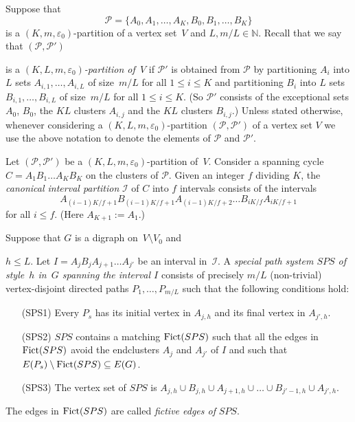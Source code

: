\documentclass{memo-l}
\def\COMMENT#1{}
\def\cP{\mathcal{P}}
\def\eps{\varepsilon}
\def\epszero{\eps_0}
\numberwithin{section}{chapter}
\numberwithin{equation}{section}
\numberwithin{firstthm}{section}
\numberwithin{figure}{section}
\begin{document}
{Suppose that 
$$
\mathcal{P}=\{A_0,A_1,\dots,A_K,B_0,B_1,\dots,B_K\}
$$ is a $(K,m,\eps_0)$-partition of a vertex set~$V$ and $L,m/L\in\mathbb{N}$.
Recall that we say that $(\mathcal{P},\mathcal{P'})$%
\COMMENT{the roles of $\mathcal{P},\mathcal{P'}$ were interchanged in a recent version. There may be places where this was overlooked.}
 is a \emph{$(K, L, m, \epszero)$-partition of~$V$} if $\mathcal{P'}$ is 
obtained from $\mathcal{P}$ by partitioning  $A_i$ 
into $L$ sets $A_{i,1},\dots,A_{i,L}$ of size~$m/L$ for all $1 \leq i \leq K$ and partitioning  $B_i$  into $L$ sets $B_{i,1},\dots,B_{i,L}$ of size~$m/L$ for all $1 \leq i \leq K$.
(So $\cP'$ consists of the exceptional sets $A_0$, $B_0$, the $KL$ clusters $A_{i,j}$ and the $KL$ clusters $B_{i,j}$.)
Unless stated otherwise, whenever considering a $(K, L, m, \epszero)$-partition $(\mathcal{P},\mathcal{P'})$ of a vertex set $V$
we use the above notation to denote the elements of $\mathcal P$ and $\mathcal P'$.

Let $(\mathcal{P},\mathcal{P'})$ be a $(K,L,m, \epszero)$-partition of~$V$.
Consider a spanning cycle $C = A_1 B_1 \dots A_K B_K$ on the clusters of $\mathcal{P}$.
Given an integer $f$ dividing $K$, the \emph{canonical interval partition} $\mathcal{I}$ of $C$ into $f$ intervals
consists of the intervals $$A_{(i-1)K/f+1} B_{(i-1)K/f+1} A_{(i-1)K/f+2} \dots B_{iK/f} A_{iK/f+1}$$ for all $i\le f$.
(Here $A_{K+1}:=A_1$.)

Suppose that $G$ is a digraph on~$V\setminus V_0$ and%
    \COMMENT{Have $V\setminus V_0$ instead of $V$ here since this is what we use later.}
$h\le L$. Let $I=A_jB_jA_{j+1}\dots A_{j'}$ be an interval in~$\mathcal{I}$.
A \emph{special path system $SPS$ of style~$h$ in~$G$ 
spanning the interval $I$} consists of precisely $m/L$ (non-trivial)
vertex-disjoint directed paths $P_1,\dots,P_{m/L}$ such that the following conditions hold:
\begin{itemize}
\item[(SPS1)] Every $P_s$ has its initial vertex in $A_{j,h}$ and its final vertex in $A_{j',h}$.
\item[(SPS2)] $SPS$ contains a matching ${\rm Fict}(SPS)$ such that all the edges in ${\rm Fict}(SPS)$ avoid the
endclusters $A_j$ and $A_{j'}$ of $I$ and such that $E(P_s)\setminus {\rm Fict}(SPS)\subseteq E(G)$.
\item[(SPS3)] The vertex set of $SPS$ is $A_{j,h}\cup B_{j,h}\cup A_{j+1,h}\cup \dots \cup B_{j'-1,h}\cup A_{j',h}$.
\end{itemize}
The edges in ${\rm Fict}(SPS)$ are called \emph{fictive edges of} $SPS$.

}
\end{document}
